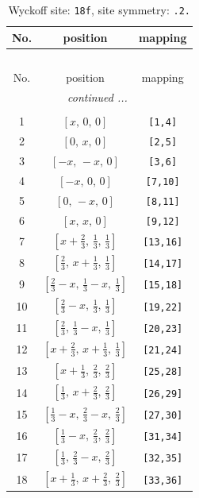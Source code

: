 \documentclass[fleqn,8pt]{jsarticle}
\begin{document}
\begin{longtable}{ccc}
\caption{Wyckoff site: {\tt 18f}, site symmetry: {\tt .2.}}
 \\
 \hline \hline
No. & position & mapping \\ \hline \endfirsthead

\multicolumn{2}{l}{\tablename\ \thetable{}} \\
 \hline \hline
No. & position & mapping \\ \hline \endhead

 \hline \hline
\multicolumn{2}{r}{\footnotesize\it continued ...} \\ \endfoot

 \hline \hline
\multicolumn{2}{r}{} \\ \endlastfoot

1 & $\left[ x,\, 0,\, 0 \right]$ & {\tt [1,4]} \\ \hline
2 & $\left[ 0,\, x,\, 0 \right]$ & {\tt [2,5]} \\ \hline
3 & $\left[ - x,\, - x,\, 0 \right]$ & {\tt [3,6]} \\ \hline
4 & $\left[ - x,\, 0,\, 0 \right]$ & {\tt [7,10]} \\ \hline
5 & $\left[ 0,\, - x,\, 0 \right]$ & {\tt [8,11]} \\ \hline
6 & $\left[ x,\, x,\, 0 \right]$ & {\tt [9,12]} \\ \hline
7 & $\left[ x + \frac{2}{3},\, \frac{1}{3},\, \frac{1}{3} \right]$ & {\tt [13,16]} \\ \hline
8 & $\left[ \frac{2}{3},\, x + \frac{1}{3},\, \frac{1}{3} \right]$ & {\tt [14,17]} \\ \hline
9 & $\left[ \frac{2}{3} - x,\, \frac{1}{3} - x,\, \frac{1}{3} \right]$ & {\tt [15,18]} \\ \hline
10 & $\left[ \frac{2}{3} - x,\, \frac{1}{3},\, \frac{1}{3} \right]$ & {\tt [19,22]} \\ \hline
11 & $\left[ \frac{2}{3},\, \frac{1}{3} - x,\, \frac{1}{3} \right]$ & {\tt [20,23]} \\ \hline
12 & $\left[ x + \frac{2}{3},\, x + \frac{1}{3},\, \frac{1}{3} \right]$ & {\tt [21,24]} \\ \hline
13 & $\left[ x + \frac{1}{3},\, \frac{2}{3},\, \frac{2}{3} \right]$ & {\tt [25,28]} \\ \hline
14 & $\left[ \frac{1}{3},\, x + \frac{2}{3},\, \frac{2}{3} \right]$ & {\tt [26,29]} \\ \hline
15 & $\left[ \frac{1}{3} - x,\, \frac{2}{3} - x,\, \frac{2}{3} \right]$ & {\tt [27,30]} \\ \hline
16 & $\left[ \frac{1}{3} - x,\, \frac{2}{3},\, \frac{2}{3} \right]$ & {\tt [31,34]} \\ \hline
17 & $\left[ \frac{1}{3},\, \frac{2}{3} - x,\, \frac{2}{3} \right]$ & {\tt [32,35]} \\ \hline
18 & $\left[ x + \frac{1}{3},\, x + \frac{2}{3},\, \frac{2}{3} \right]$ & {\tt [33,36]} \\
\end{longtable}
\end{document}
